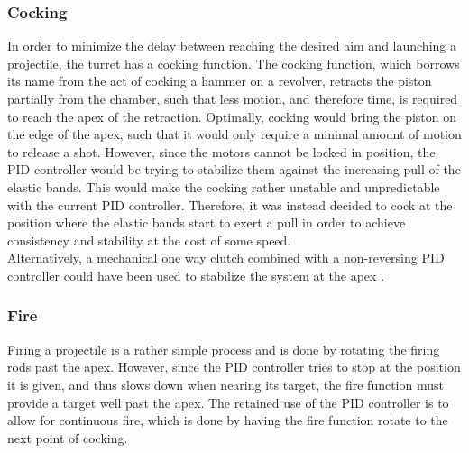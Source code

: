 \subsubsection{Cocking}
In order to minimize the delay between reaching the desired aim and launching a projectile, the turret has a cocking function. The cocking function, which borrows its name from the act of cocking a hammer on a revolver, retracts the piston partially from the chamber, such that less motion, and therefore time, is required to reach the apex of the retraction. Optimally, cocking would bring the piston on the edge of the apex, such that it would only require a minimal amount of motion to release a shot. However, since the motors cannot be locked in position, the PID controller would be trying to stabilize them against the increasing pull of the elastic bands. This would make the cocking rather unstable and unpredictable with the current PID controller. Therefore, it was instead decided to cock at the position where the elastic bands start to exert a pull in order to achieve consistency and stability at the cost of some speed. \\

Alternatively, a mechanical one way clutch combined with a non-reversing PID controller could have been used to stabilize the system at the apex \cite{clutch}.

\subsubsection{Fire} 
Firing a projectile is a rather simple process and is done by rotating the firing rods past the apex. However, since the PID controller tries to stop at the position it is given, and thus slows down when nearing its target, the fire function must provide a target well past the apex. The retained use of the PID controller is to allow for continuous fire, which is done by having the fire function rotate to the next point of cocking.









